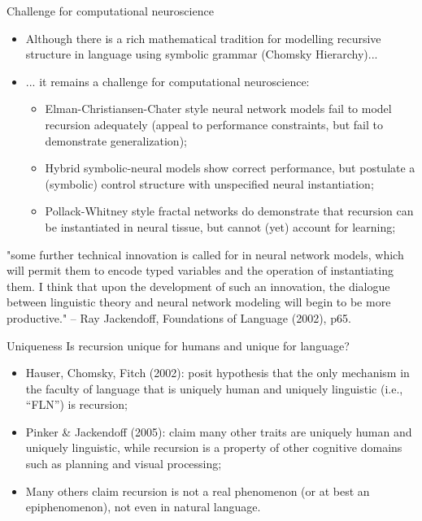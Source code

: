 \documentclass[xcolor=table]{beamer}
\begin{document}
\begin{frame}{Challenge for computational neuroscience}
  \begin{itemize}[<+->]
  \item Although there is a rich mathematical tradition for modelling
    recursive structure in language using symbolic grammar (Chomsky Hierarchy)...
  \item ... it remains a challenge for computational neuroscience:
    \begin{itemize}
    \item Elman-Christiansen-Chater style neural network models fail
      to model recursion adequately (appeal to performance
      constraints, but fail to demonstrate generalization);
    \item Hybrid symbolic-neural models show correct performance, but
      postulate a (symbolic) control structure with unspecified neural
      instantiation;
    \item Pollack-Whitney style fractal networks do demonstrate that
      recursion can be instantiated in neural tissue, but cannot (yet)
      account for learning;
    \end{itemize}
  \end{itemize}
\end{frame}

\begin{frame}
  "some further technical innovation is called for in neural network
models, which will permit them to encode typed variables and the
operation of instantiating them. I think that upon the development of
such an innovation, the dialogue between linguistic theory and neural
network modeling will begin to be more productive." -- Ray Jackendoff,
Foundations of Language (2002), p65.
\end{frame}

\begin{frame}{Uniqueness}
  Is recursion unique for humans and unique for language?

  \begin{itemize}[<+->]
  \item Hauser, Chomsky, Fitch (2002): posit hypothesis that the only
    mechanism in the faculty of language that is uniquely human and
    uniquely linguistic (i.e., ``FLN'') is recursion;
  \item Pinker \& Jackendoff (2005): claim many other traits are
    uniquely human and uniquely linguistic, while recursion is a
    property of other cognitive domains such as planning and visual
    processing;
  \item Many others claim recursion is not a real phenomenon (or at
    best an epiphenomenon), not even in natural language.
  \end{itemize}
\end{frame}
\end{document}
